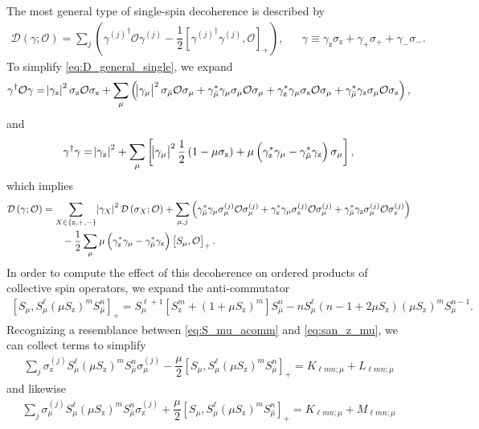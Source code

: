 \documentclass[aps,notitlepage,nofootinbib,11pt]{revtex4-1}
\newcommand{\f}[2]{\dfrac{#1}{#2}} %
\newcommand{\p}[1]{\left(#1\right)} %
\renewcommand{\sp}[1]{\left[#1\right]} %
\renewcommand{\set}[1]{\left\{#1\right\}} %
\newcommand{\D}{\mathcal{D}}
\renewcommand{\O}{\mathcal{O}}
\newcommand{\z}{\text{z}}
\newcommand{\bmu}{{\bar\mu}}
\newcommand{\1}{\mathds{1}}
\begin{document}
The most general type of single-spin decoherence is described by
\begin{align}
  \D\p{\gamma;\O}
  = \sum_j\p{{\gamma^{(j)}}^\dag \O \gamma^{(j)}
    - \f12\sp{{\gamma^{(j)}}^\dag \gamma^{(j)}, \O}_+},
  &&
  \gamma \equiv \gamma_\z \sigma_\z
  + \gamma_+ \sigma_+ + \gamma_- \sigma_-.
  \label{eq:D_general_single}
\end{align}
To simplify \eqref{eq:D_general_single}, we expand
\begin{align}
  \gamma^\dag \O \gamma
  = \abs{\gamma_\z}^2 \sigma_\z \O \sigma_\z
  + \sum_\mu \p{\abs{\gamma_\mu}^2 \sigma_\bmu \O \sigma_\mu
    + \gamma_\bmu^* \gamma_\mu \sigma_\mu \O \sigma_\mu
    + \gamma_\z^* \gamma_\mu \sigma_\z \O \sigma_\mu
    + \gamma_\bmu^* \gamma_\z \sigma_\mu \O \sigma_\z},
\end{align}
and
\begin{align}
  \gamma^\dag \gamma
  = \abs{\gamma_\z}^2
  + \sum_\mu \sp{\abs{\gamma_\mu}^2 \f12 \p{1-\mu\sigma_\z}
    + \mu \p{\gamma_\z^*\gamma_\mu - \gamma_\bmu^*\gamma_\z}
    \sigma_\mu},
\end{align}
which implies
\begin{align}
  \D\p{\gamma;\O}
  &= \sum_{X\in\set{\z,+,-}} \abs{\gamma_X}^2 \D\p{\sigma_X;\O}
  + \sum_{\mu,j}
  \p{\gamma_\bmu^* \gamma_\mu \sigma_\mu^{(j)} \O \sigma_\mu^{(j)}
    + \gamma_\z^* \gamma_\mu \sigma_\z^{(j)} \O \sigma_\mu^{(j)}
    + \gamma_\bmu^* \gamma_\z \sigma_\mu^{(j)} \O \sigma_\z^{(j)}}
  \notag \\
  &\qquad -\f12 \sum_\mu \mu
  \p{\gamma_\z^*\gamma_\mu - \gamma_\bmu^*\gamma_\z} \sp{S_\mu, \O}_+.
\end{align}
In order to compute the effect of this decoherence on ordered products
of collective spin operators, we expand the anti-commutator
\begin{align}
  \sp{S_\mu, S_\mu^\ell \p{\mu S_\z}^m S_\bmu^n}_+
  = S_\mu^{\ell+1} \sp{S_\z^m+\p{1+\mu S_\z}^m} S_\bmu^n
  - n S_\mu^\ell \p{n-1+2\mu S_\z} \p{\mu S_\z}^m S_\bmu^{n-1}.
  \label{eq:S_mu_acomm}
\end{align}
Recognizing a resemblance between \eqref{eq:S_mu_acomm} and
\eqref{eq:san_z_mu}, we can collect terms to simplify
\begin{align}
  \sum_j \sigma_\z^{(j)} S_\mu^\ell
  \p{\mu S_\z}^m S_\bmu^n \sigma_\mu^{(j)}
  - \f{\mu}{2} \sp{S_\mu, S_\mu^\ell \p{\mu S_\z}^m S_\bmu^n}_+
  = K_{\ell mn;\mu} + L_{\ell mn;\mu}
  \label{eq:dec_z_mu}
\end{align}
and likewise
\begin{align}
  \sum_j \sigma_\mu^{(j)} S_\mu^\ell
  \p{\mu S_\z}^m S_\bmu^n \sigma_\z^{(j)}
  + \f{\mu}{2} \sp{S_\mu, S_\mu^\ell \p{\mu S_\z}^m S_\bmu^n}_+
  = K_{\ell mn;\mu} + M_{\ell mn;\mu}
  \label{eq:dec_mu_z}
\end{align}
\end{document}
